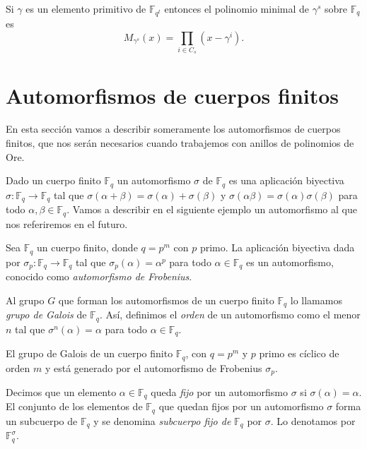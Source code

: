 \begin{theorem}
  \label{th:pol-minimal-el-primitivo}
  Si \(\gamma\) es un elemento primitivo de \(\mathbb F_{q^t}\) entonces el polinomio minimal de \(\gamma^s\) sobre \(\mathbb F_q\) es
  \[
    M_{\gamma^s}(x) = \prod_{i \in C_s}(x - \gamma^i).
  \]
\end{theorem}

\section{Automorfismos de cuerpos finitos}

En esta sección vamos a describir someramente los automorfismos de cuerpos finitos, que nos serán necesarios cuando trabajemos con anillos de polinomios de Ore.

Dado un cuerpo finito \(\mathbb F_q\) un automorfismo \(\sigma\) de \(\mathbb F_q\) es una aplicación biyectiva \(\sigma: \mathbb F_q \to \mathbb F_q\) tal que \(\sigma(\alpha + \beta) = \sigma(\alpha) + \sigma(\beta)\) y \(\sigma(\alpha \beta) = \sigma(\alpha)\sigma(\beta)\) para todo \(\alpha, \beta \in \mathbb F_q\).
Vamos a describir en el siguiente ejemplo un automorfismo al que nos referiremos en el futuro.

\begin{example}
  Sea \(\mathbb F_q\) un cuerpo finito, donde \(q = p^m\) con \(p\) primo. 
  La aplicación biyectiva dada por \(\sigma_p : \mathbb F_q \to \mathbb F_q\) tal que \(\sigma_p(\alpha) = \alpha^p\) para todo \(\alpha \in \mathbb F_q\) es un automorfismo, conocido como \emph{automorfismo de Frobenius}.
\end{example}

Al grupo \(G\) que forman los automorfismos de un cuerpo finito \(\mathbb F_q\) lo llamamos \emph{grupo de Galois} de \(\mathbb F_q\).
Así, definimos el \emph{orden} de un automorfismo como el menor \(n\) tal que \(\sigma^n(\alpha) = \alpha\) para todo \(\alpha \in \mathbb F_q\).

\begin{theorem}
  El grupo de Galois de un cuerpo finito \(\mathbb F_q\), con \(q = p^m\) y \(p\) primo es cíclico de orden \(m\) y está generado por el automorfismo de Frobenius \(\sigma_p\).
\end{theorem}

Decimos que un elemento \(\alpha \in \mathbb F_q\) queda \emph{fijo} por un automorfismo \(\sigma\) si \(\sigma(\alpha) = \alpha\).
El conjunto de los elementos de \(\mathbb F_q\) que quedan fijos por un automorfismo \(\sigma\) forma un subcuerpo de \(\mathbb F_q\) y se denomina \emph{subcuerpo fijo de} \(\mathbb F_q\) por \(\sigma\).
Lo denotamos por \(\mathbb F_q^{\sigma}\).

